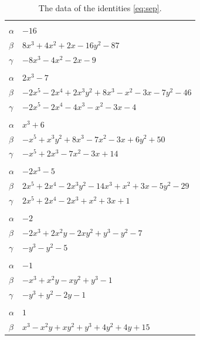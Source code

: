 \documentclass[11pt]{article}
\begin{document}
\begingroup\footnotesize
\setlength{\LTcapwidth}{\textwidth}
\begin{longtable}{@{}ll@{}}
\caption{The data of the identities \eqref{eq:sep}.}\label{tab:sep}\\
\hline\endfirsthead\hline\endhead\hline\endfoot
\multicolumn{2}{@{}l}{$\{i,j\}=\{0,12\}$, $k_{ij}=7$}\\
$\alpha$ & $-16$\\
$\beta$ & $8x^{3}+4x^{2}+2x-16y^{2}-87$\\
$\gamma$ & $-8x^{3}-4x^{2}-2x-9$\\
\addlinespace[3pt]
\multicolumn{2}{@{}l}{$\{i,j\}=\{0,26\}$, $k_{ij}=11$}\\
$\alpha$ & $2x^{3}-7$\\
$\beta$ & $-2x^{5}-2x^{4}+2x^{3}y^{2}+8x^{3}-x^{2}-3x-7y^{2}-46$\\
$\gamma$ & $-2x^{5}-2x^{4}-4x^{3}-x^{2}-3x-4$\\
\addlinespace[3pt]
\multicolumn{2}{@{}l}{$\{i,j\}=\{0,28\}$, $k_{ij}=2\cdot 11$}\\
$\alpha$ & $x^{3}+6$\\
$\beta$ & $-x^{5}+x^{3}y^{2}+8x^{3}-7x^{2}-3x+6y^{2}+50$\\
$\gamma$ & $-x^{5}+2x^{3}-7x^{2}-3x+14$\\
\addlinespace[3pt]
\multicolumn{2}{@{}l}{$\{i,j\}=\{0,37\}$, $k_{ij}=7$}\\
$\alpha$ & $-2x^{3}-5$\\
$\beta$ & $2x^{5}+2x^{4}-2x^{3}y^{2}-14x^{3}+x^{2}+3x-5y^{2}-29$\\
$\gamma$ & $2x^{5}+2x^{4}-2x^{3}+x^{2}+3x+1$\\
\addlinespace[3pt]
\multicolumn{2}{@{}l}{$\{i,j\}=\{1,4\}$, $k_{ij}=2$}\\
$\alpha$ & $-2$\\
$\beta$ & $-2x^{3}+2x^{2}y-2xy^{2}+y^{3}-y^{2}-7$\\
$\gamma$ & $-y^{3}-y^{2}-5$\\
\addlinespace[3pt]
\multicolumn{2}{@{}l}{$\{i,j\}=\{1,8\}$, $k_{ij}=3$}\\
$\alpha$ & $-1$\\
$\beta$ & $-x^{3}+x^{2}y-xy^{2}+y^{3}-1$\\
$\gamma$ & $-y^{3}+y^{2}-2y-1$\\
\addlinespace[3pt]
\multicolumn{2}{@{}l}{$\{i,j\}=\{1,11\}$, $k_{ij}=2\cdot 3$}\\
$\alpha$ & $1$\\
$\beta$ & $x^{3}-x^{2}y+xy^{2}+y^{3}+4y^{2}+4y+15$\\

\end{longtable}
\end{document}
